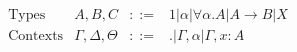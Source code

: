 \documentclass[paper.tex]{subfiles}
\begin{document}
\[
\begin{array}{lccl}
\text{Types} & A,B,C &::=& 1 | \alpha | \forall \alpha.A | A \rightarrow B | X\\
\text{Contexts} & \Gamma, \Delta, \Theta &::=& . | \Gamma, \alpha | \Gamma, x:A \\
\end{array}
\]
\end{document}
